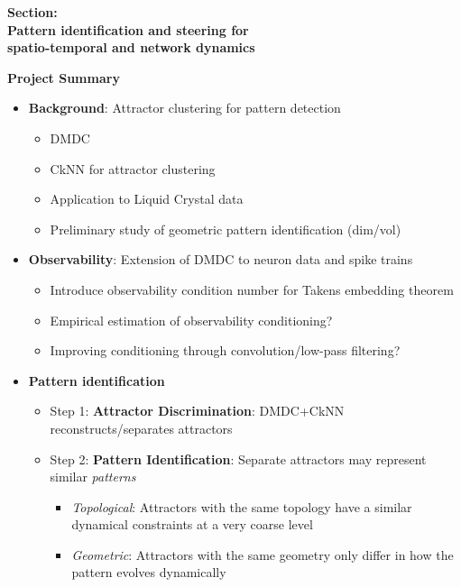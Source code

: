 \documentclass[11pt]{article}
\def\bc{\begin{center}}
\def\ec{\end{center}}
\begin{document}
\renewcommand{\rightmark}{Project Description}


\bc \Large\bf Section: \\ \Large Pattern identification and steering for \\ spatio-temporal and network dynamics
\ec
\bc \large\bf Project Summary \ec

\begin{itemize}
	\item {\bf Background}: Attractor clustering for pattern detection
	\begin{itemize}
		\item DMDC
		\item CkNN for attractor clustering
		\item Application to Liquid Crystal data
		\item Preliminary study of geometric pattern identification (dim/vol)
	\end{itemize}
	\item {\bf Observability}: Extension of DMDC to neuron data and spike trains
	\begin{itemize}
		\item Introduce observability condition number for Takens embedding theorem
		\item Empirical estimation of observability conditioning?
		\item Improving conditioning through convolution/low-pass filtering?
	\end{itemize}
	\item {\bf Pattern identification}
	\begin{itemize}
		\item Step 1: {\bf Attractor Discrimination}: DMDC+CkNN reconstructs/separates attractors
		\item Step 2: {\bf Pattern Identification}:  Separate attractors may represent similar \emph{patterns}
		\begin{itemize}
			\item {\it Topological}: Attractors with the same topology have a similar dynamical constraints at a very coarse level
			\item {\it Geometric}: Attractors with the same geometry only differ in how the pattern evolves dynamically

\end{itemize}
\end{itemize}
\end{itemize}
\end{document}
